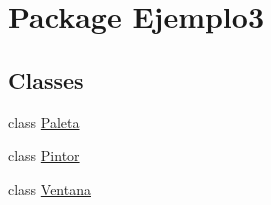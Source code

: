 \hypertarget{namespace_ejemplo3}{}\section{Package Ejemplo3}
\label{namespace_ejemplo3}
\subsection*{Classes}
\begin{DoxyCompactItemize}
\item 
class \mbox{\hyperlink{class_ejemplo3_1_1_paleta}{Paleta}}
\item 
class \mbox{\hyperlink{class_ejemplo3_1_1_pintor}{Pintor}}
\item 
class \mbox{\hyperlink{class_ejemplo3_1_1_ventana}{Ventana}}
\end{DoxyCompactItemize}
